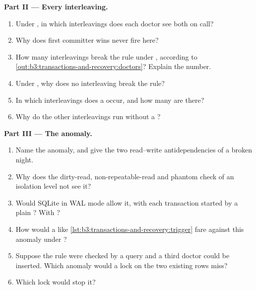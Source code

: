 \begin{problem}
\medskip\noindent\textbf{Part II --- Every interleaving.}
\begin{enumerate}[resume]
  \item Under , in which interleavings does each doctor see both on call?
  \item Why does first committer wins never fire here?
  \item How many interleavings break the rule under , according to \cref{out:b3:transactions-and-recovery:doctors}? Explain the number.
  \item Under , why does no interleaving break the rule?
  \item In which interleavings does a  occur, and how many are there?
  \item Why do the other interleavings run without a ?
\end{enumerate}

\medskip\noindent\textbf{Part III --- The anomaly.}
\begin{enumerate}[resume]
  \item Name the anomaly, and give the two read--write antidependencies of a broken night.
  \item Why does the dirty-read, non-repeatable-read and phantom check of an isolation level not see it?
  \item Would SQLite in WAL mode allow it, with each transaction started by a plain ? With ?
  \item How would a  like \cref{lst:b3:transactions-and-recovery:trigger} fare against this anomaly under ?
  \item Suppose the rule were checked by a query  and a third doctor could be inserted. Which anomaly would a lock on the two existing rows miss?
  \item Which lock would stop it?
\end{enumerate}


\end{problem}
